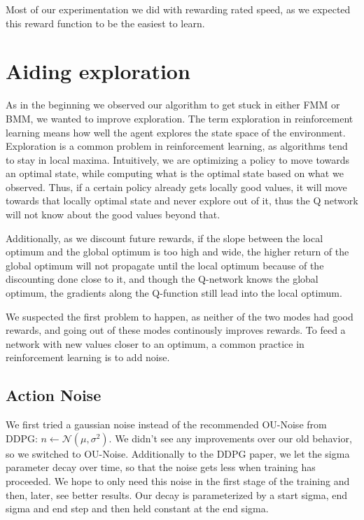 \documentclass[hyperref,german,beleg]{cgvpub}
\begin{document}
Most of our experimentation we did with rewarding rated speed, as we expected this reward function to be the easiest to learn.

\section{Aiding exploration}

As in the beginning we observed our algorithm to get stuck in either \ac{FMM} or \ac{BMM}, we wanted to improve exploration. The term exploration in reinforcement learning means how well the agent explores the state space of the environment. Exploration is a common problem in reinforcement learning, as algorithms tend to stay in local maxima. Intuitively, we are optimizing a policy to move towards an optimal state, while computing what is the optimal state based on what we observed. Thus, if a certain policy already gets locally good values, it will move towards that locally optimal state and never explore out of it, thus the Q network will not know about the good values beyond that. 

Additionally, as we discount future rewards, if the slope between the local optimum and the global optimum is too high and wide, the higher return of the global optimum will not propagate until the local optimum because of the discounting done close to it, and though the Q-network knows the global optimum, the gradients along the Q-function still lead into the local optimum.

We suspected the first problem to happen, as neither of the two modes had good rewards, and going out of these modes continously improves rewards. To feed a network with new values closer to an optimum, a common practice in reinforcement learning is to add noise.

\subsection{Action Noise}

We first tried a gaussian noise instead of the recommended \ac{OU-Noise} \cite{uhlenbeckTheoryBrownianMotion1930} from \ac{DDPG}: \(n \leftarrow \mathcal{N}(\mu, \sigma^2) \). We didn't see any improvements over our old behavior, so we switched to \ac{OU-Noise}. Additionally to the \ac{DDPG} paper, we let the sigma parameter decay over time, so that the noise gets less when training has proceeded. We hope to only need this noise in the first stage of the training and then, later, see better results. Our decay is parameterized by a start sigma, end sigma and end step and then held constant at the end sigma.
\end{document}
